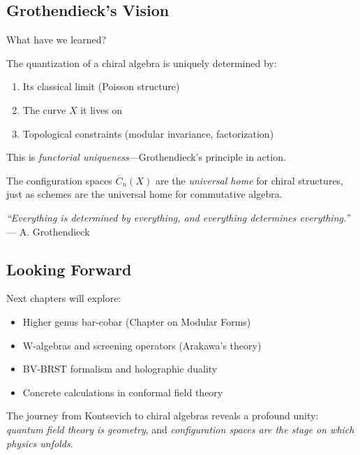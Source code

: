 \subsection{Grothendieck's Vision}

What have we learned?

The quantization of a chiral algebra is uniquely determined by:
\begin{enumerate}
\item Its classical limit (Poisson structure)
\item The curve $X$ it lives on
\item Topological constraints (modular invariance, factorization)
\end{enumerate}

This is \emph{functorial uniqueness}—Grothendieck's principle in action.

The configuration spaces $\overline{C}_n(X)$ are the \emph{universal home} for chiral structures, just as schemes are the universal home for commutative algebra.

\begin{center}
\textit{``Everything is determined by everything, and everything determines everything.''} \\
— A. Grothendieck
\end{center}

\subsection{Looking Forward}

Next chapters will explore:
\begin{itemize}
\item Higher genus bar-cobar (Chapter on Modular Forms)
\item W-algebras and screening operators (Arakawa's theory)
\item BV-BRST formalism and holographic duality
\item Concrete calculations in conformal field theory
\end{itemize}

The journey from Kontsevich to chiral algebras reveals a profound unity: \emph{quantum field theory is geometry}, and \emph{configuration spaces are the stage on which physics unfolds}.